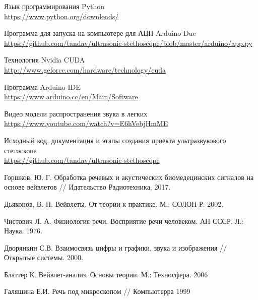 \documentclass[../main.tex]{subfiles}
\begin{document}
\begin{thebibliography}{}
Язык программирования Python\\
\url{https://www.python.org/downloads/}

Программа для запуска на компьютере для АЦП Arduino Due\\
\url{https://github.com/tandav/ultrasonic-stethoscope/blob/master/arduino/app.py}

Технология Nvidia CUDA\\
\url{http://www.geforce.com/hardware/technology/cuda}

Программа Arduino IDE\\
\url{https://www.arduino.cc/en/Main/Software}

Видео модели распространения звука в легких\\
\url{https://www.youtube.com/watch?v=E6hVebjHmME}

Исходный код, документация и этапы создания проекта ультразвукового стетоскопа\\
\url{https://github.com/tandav/ultrasonic-stethoscope}

Горшков, Ю. Г. Обработка речевых и акустических биомедецинских сигналов на основе вейвлетов // Идательство Радиотехника, 2017.

Дьяконов, В. П. Вейвлеты. От теории к практике. М.: СОЛОН-Р. 2002.

Чистович Л. А. Физиология речи. Восприятие речи человеком. АН СССР. Л.: Наука. 1976.

Дворянкин С.В. Взаимосвязь цифры и графики, звука и изображения // Открытые системы. 2000.

Блаттер К. Вейвлет-анализ. Основы теории. М.: Техносфера. 2006

Галяшина Е.И. Речь под микроскопом // Компьютерра 1999

\end{thebibliography}
\end{document}
